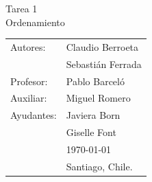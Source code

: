 \documentclass[11pt,letterpaper]{article}
\begin{document}
\newpage
\pagestyle{fancy}
\fancyhf{}
\vspace*{6cm}
\begin{center}
\Huge  {Tarea 1}\\
\vspace{1cm}
\huge {Ordenamiento}\\
\vspace{1cm}
\end{center}
\vfill
\begin{flushright}
\begin{tabular}{ll}
Autores: & Claudio Berroeta\\
& Sebastián Ferrada \\
Profesor: & Pablo Barceló\\
Auxiliar: & Miguel Romero\\
Ayudantes: & Javiera Born\\
& Giselle Font\\
& \today\\
& Santiago, Chile.
\end{tabular}
\end{flushright}

\newpage
\pagestyle{fancy}
\fancyhf{}

\fancyhead[R]{\small \rm \textbf{\thepage}} %



\renewcommand{\sectionmark}[1]{\markright{\thesection.\ #1}}
\renewcommand{\headrulewidth}{0.5pt}
\renewcommand{\footrulewidth}{0.5pt}
\end{document}
